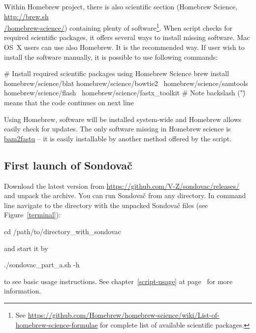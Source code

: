 \documentclass[a4paper, 11pt, twoside]{article}
\begin{document}
Within Homebrew project, there is also scientific section (Homebrew Science, \href{http://brew.sh/homebrew-science/}{http://brew.sh\\/homebrew-science/}) containing plenty of software\footnote{See \href{https://github.com/Homebrew/homebrew-science/wiki/List-of-homebrew-science-formulae}{https://github.com/Homebrew/homebrew-science/wiki/List-of-homebrew-science-formulae} for complete list of available scientific packages.}. When script checks for required scientific packages, it offers several ways to install missing software. Mac OS~X users can use also Homebrew. It is the recommended way. If user wish to install the software manually, it is possible to use following commands:

\begin{bashcode}
  # Install required scientific packages using Homebrew Science
  brew install homebrew/science/blat homebrew/science/bowtie2 \
    homebrew/science/samtools homebrew/science/flash \
    homebrew/science/fastx_toolkit
  # Note backslash ("\") means that the code continues on next line
\end{bashcode}

Using Homebrew, software will be installed system-wide and Homebrew allows easily check for updates. The only software missing in Homebrew science is \href{http://gsl.hudsonalpha.org/information/software/bam2fastq}{bam2fastq} -- it is easily installable by another method offered by the script.

\subsection{First launch of Sondovač}
\label{script-start}

Download the latest version from \href{https://github.com/V-Z/sondovac/releases/}{https://github.com/V-Z/sondovac/releases/} and unpack the archive. You can run Sondovač from any directory. In command line navigate to the directory with the unpacked Sondovač files (see Figure~\ref{terminal}):

\begin{bashcode}
  cd /path/to/directory_with_sondovac
\end{bashcode}

and start it by

\begin{bashcode}
  ./sondovac_part_a.sh -h
\end{bashcode}

to see basic usage instructions. See chapter~\ref{script-usage} at page~\pageref{script-usage} for more information.
\end{document}
